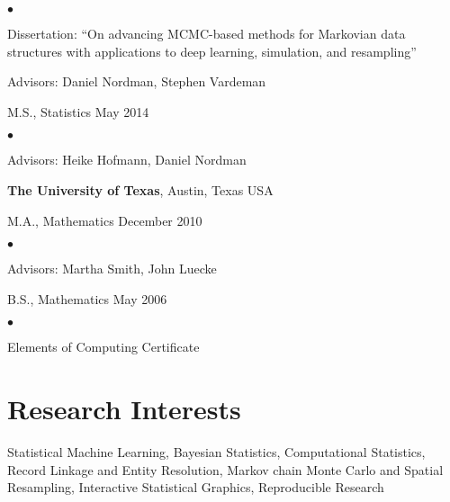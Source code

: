 \documentclass[margin,line]{res}
\newenvironment{list1}{
  \begin{list}{\ding{113}}{%
      \setlength{\itemsep}{0in}
      \setlength{\parsep}{0in} \setlength{\parskip}{0in}
      \setlength{\topsep}{0in} \setlength{\partopsep}{0in}
      \setlength{\leftmargin}{0.17in}}}{\end{list}}
\newenvironment{list2}{
  \begin{list}{$\bullet$}{%
      \setlength{\itemsep}{0in}
      \setlength{\parsep}{0in} \setlength{\parskip}{0in}
      \setlength{\topsep}{0in} \setlength{\partopsep}{0in}
      \setlength{\leftmargin}{0.2in}}}{\end{list}}
\begin{document}
\begin{resume}
\begin{list1}
\begin{list2}
\vspace*{.05in}
\item[] Dissertation:  ``On advancing MCMC-based methods for Markovian data structures with applications to deep learning, simulation, and resampling''
\item[] Advisors: Daniel Nordman, Stephen Vardeman
\end{list2}
\vspace*{.05in}
\item[]M.S., Statistics \hfill May 2014

\begin{list2}
\vspace*{.05in}
\item[] Advisors: Heike Hofmann, Daniel Nordman
\end{list2}
\end{list1}
{\bf The University of Texas}, Austin, Texas USA\\
\vspace*{-.1in}
\begin{list1}
\item[]M.A., Mathematics \hfill December 2010

\begin{list2}
\vspace*{.05in}
\item[] Advisors: Martha Smith, John Luecke
\end{list2}
\vspace*{.05in}
\item[] B.S., Mathematics \hfill May 2006

\begin{list2}
\vspace*{.05in}
\item[] Elements of Computing Certificate
\end{list2}
\end{list1}

\section{\sc Research Interests}
Statistical Machine Learning, Bayesian Statistics, Computational Statistics, Record Linkage and Entity Resolution,  Markov chain Monte Carlo and Spatial Resampling, Interactive Statistical Graphics, Reproducible Research


\end{resume}
\end{document}
